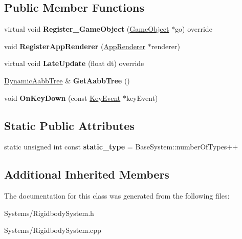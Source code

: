 \subsection*{Public Member Functions}
\begin{DoxyCompactItemize}
\item 
\mbox{\label{classRigidbodySystem_adcb7612aeca5d51fa8d886cfd15de991}} 
virtual void {\bfseries Register\+\_\+\+Game\+Object} (\hyperlink{classGameObject}{Game\+Object} $\ast$go) override
\item 
\mbox{\label{classRigidbodySystem_a5235d7d991327cac42986523c5d44580}} 
void {\bfseries Register\+App\+Renderer} (\hyperlink{classAppRenderer}{App\+Renderer} $\ast$renderer)
\item 
\mbox{\label{classRigidbodySystem_a3ae11c7e5a8572247fb2e01729e32af9}} 
virtual void {\bfseries Late\+Update} (float dt) override
\item 
\mbox{\label{classRigidbodySystem_aadf0ff84d1e6469ca8d6281aa0f9af70}} 
\hyperlink{classDynamicAabbTree}{Dynamic\+Aabb\+Tree} \& {\bfseries Get\+Aabb\+Tree} ()
\item 
\mbox{\label{classRigidbodySystem_adf706ab9fd20dde6f148514d76bfa982}} 
void {\bfseries On\+Key\+Down} (const \hyperlink{classKeyEvent}{Key\+Event} $\ast$key\+Event)
\end{DoxyCompactItemize}
\subsection*{Static Public Attributes}
\begin{DoxyCompactItemize}
\item 
\mbox{\label{classRigidbodySystem_a4149fa1ec0b595ce1e4d3f45ed7da797}} 
static unsigned int const {\bfseries static\+\_\+type} = Base\+System\+::number\+Of\+Types++
\end{DoxyCompactItemize}
\subsection*{Additional Inherited Members}


The documentation for this class was generated from the following files\+:\begin{DoxyCompactItemize}
\item 
Systems/Rigidbody\+System.\+h\item 
Systems/Rigidbody\+System.\+cpp\end{DoxyCompactItemize}
